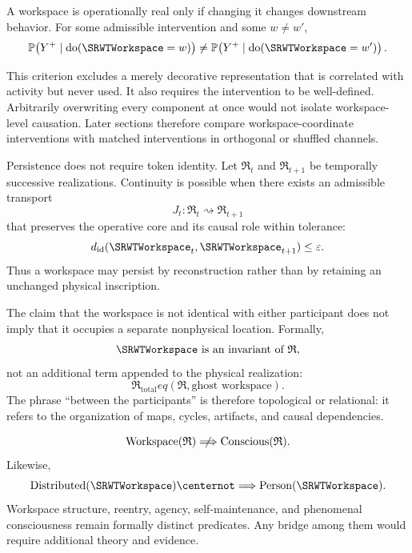 
A workspace is operationally real only if changing it changes downstream
behavior. For some admissible intervention and some \(w\neq w'\),
\[
\mathbb P\!\left(
Y^+\mid\operatorname{do}(\SRWTWorkspace=w)
\right)
\neq
\mathbb P\!\left(
Y^+\mid\operatorname{do}(\SRWTWorkspace=w')
\right).
\]

This criterion excludes a merely decorative representation that is correlated
with activity but never used. It also requires the intervention to be
well-defined. Arbitrarily overwriting every component at once would not
isolate workspace-level causation. Later sections therefore compare
workspace-coordinate interventions with matched interventions in orthogonal
or shuffled channels.


Persistence does not require token identity. Let \(\mathfrak R_t\) and
\(\mathfrak R_{t+1}\) be temporally successive realizations. Continuity is
possible when there exists an admissible transport
\[
J_t:\mathfrak R_t\rightsquigarrow\mathfrak R_{t+1}
\]
that preserves the operative core and its causal role within tolerance:
\[
d_{\mathrm{id}}(\SRWTWorkspace_t,\SRWTWorkspace_{t+1})\leq\varepsilon.
\]
Thus a workspace may persist by reconstruction rather than by retaining an
unchanged physical inscription.


The claim that the workspace is not identical with either participant does
not imply that it occupies a separate nonphysical location. Formally,
\[
\SRWTWorkspace
\text{ is an invariant of }\mathfrak R,
\]
not an additional term appended to the physical realization:
\[
\mathfrak R_{\mathrm{total}}
eq(\mathfrak R,\text{ghost workspace}).
\]
The phrase ``between the participants'' is therefore topological or
relational: it refers to the organization of maps, cycles, artifacts, and
causal dependencies.


\[
\operatorname{Workspace}(\mathfrak R)
\centernot\Longrightarrow
\operatorname{Conscious}(\mathfrak R).
\]
Likewise,
\[
\operatorname{Distributed}(\SRWTWorkspace)
\centernot\Longrightarrow
\operatorname{Person}(\SRWTWorkspace).
\]
Workspace structure, reentry, agency, self-maintenance, and phenomenal
consciousness remain formally distinct predicates. Any bridge among them
would require additional theory and evidence.

